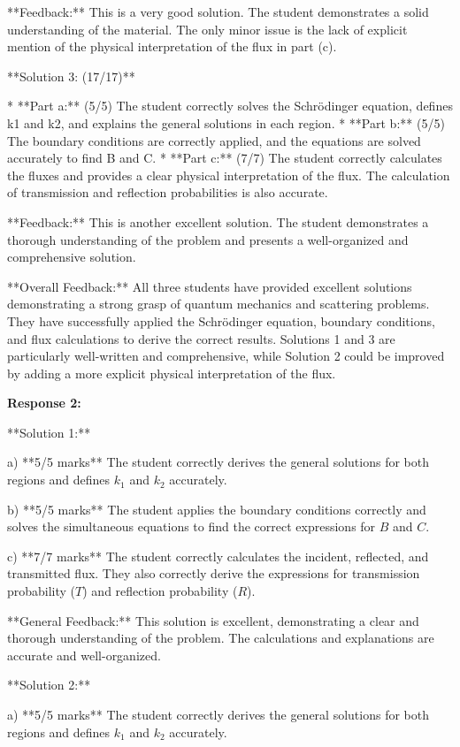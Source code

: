 \documentclass[a4paper,11pt]{article}
\begin{document}
**Feedback:** This is a very good solution. The student demonstrates a solid understanding of the material. The only minor issue is the lack of explicit mention of the physical interpretation of the flux in part (c).

**Solution 3: (17/17)**

*   **Part a:** (5/5) The student correctly solves the Schrödinger equation, defines k1 and k2, and explains the general solutions in each region.
*   **Part b:** (5/5) The boundary conditions are correctly applied, and the equations are solved accurately to find B and C.
*   **Part c:** (7/7) The student correctly calculates the fluxes and provides a clear physical interpretation of the flux. The calculation of transmission and reflection probabilities is also accurate.

**Feedback:** This is another excellent solution. The student demonstrates a thorough understanding of the problem and presents a well-organized and comprehensive solution.

**Overall Feedback:** All three students have provided excellent solutions demonstrating a strong grasp of quantum mechanics and scattering problems. They have successfully applied the Schrödinger equation, boundary conditions, and flux calculations to derive the correct results. Solutions 1 and 3 are particularly well-written and comprehensive, while Solution 2 could be improved by adding a more explicit physical interpretation of the flux.

\textbf{Response 2:}

**Solution 1:**

a) **5/5 marks**
The student correctly derives the general solutions for both regions and defines \(k_1\) and \(k_2\) accurately.

b) **5/5 marks**
The student applies the boundary conditions correctly and solves the simultaneous equations to find the correct expressions for \(B\) and \(C\).

c) **7/7 marks**
The student correctly calculates the incident, reflected, and transmitted flux. They also correctly derive the expressions for transmission probability (\(T\)) and reflection probability (\(R\)).

**General Feedback:** This solution is excellent, demonstrating a clear and thorough understanding of the problem. The calculations and explanations are accurate and well-organized.

**Solution 2:**

a) **5/5 marks**
The student correctly derives the general solutions for both regions and defines \(k_1\) and \(k_2\) accurately.
\end{document}
